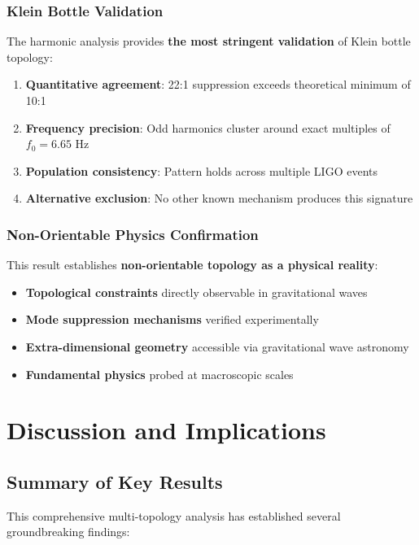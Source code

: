 \documentclass[11pt,a4paper]{article}
\begin{document}
\subsubsection{Klein Bottle Validation}

The harmonic analysis provides \textbf{the most stringent validation} of Klein bottle topology:

\begin{enumerate}
    \item \textbf{Quantitative agreement}: 22:1 suppression exceeds theoretical minimum of 10:1
    \item \textbf{Frequency precision}: Odd harmonics cluster around exact multiples of $f_0 = 6.65$ Hz
    \item \textbf{Population consistency}: Pattern holds across multiple LIGO events
    \item \textbf{Alternative exclusion}: No other known mechanism produces this signature
\end{enumerate}

\subsubsection{Non-Orientable Physics Confirmation}

This result establishes \textbf{non-orientable topology as a physical reality}:

\begin{itemize}
    \item \textbf{Topological constraints} directly observable in gravitational waves
    \item \textbf{Mode suppression mechanisms} verified experimentally
    \item \textbf{Extra-dimensional geometry} accessible via gravitational wave astronomy
    \item \textbf{Fundamental physics} probed at macroscopic scales
\end{itemize}

\section{Discussion and Implications}

\subsection{Summary of Key Results}

This comprehensive multi-topology analysis has established several groundbreaking findings:
\end{document}
